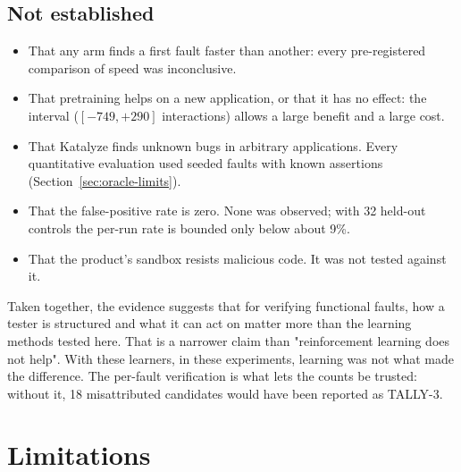 \subsection*{Not established}
\begin{itemize}[noitemsep]
  \item That any arm finds a first fault faster than another: every pre-registered
        comparison of speed was inconclusive.
  \item That pretraining helps on a new application, or that it has no effect: the interval
        ($[-749, +290]$ interactions) allows a large benefit and a large cost.
  \item That Katalyze finds unknown bugs in arbitrary applications. Every quantitative
        evaluation used seeded faults with known assertions (Section~\ref{sec:oracle-limits}).
  \item That the false-positive rate is zero. None was observed; with 32 held-out controls
        the per-run rate is bounded only below about 9\%.
  \item That the product's sandbox resists malicious code. It was not tested against it.
\end{itemize}

Taken together, the evidence suggests that for verifying functional faults, how a tester is
structured and what it can act on matter more than the learning methods tested here. That
is a narrower claim than "reinforcement learning does not help". With these learners, in
these experiments, learning was not what made the difference. The per-fault verification is
what lets the counts be trusted: without it, 18 misattributed candidates would have been
reported as TALLY-3.

\section{Limitations}

